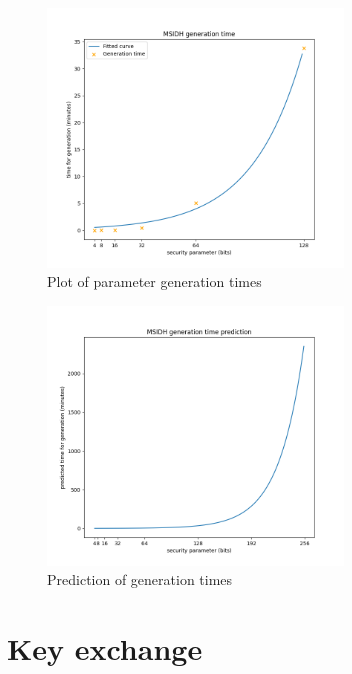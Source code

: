 \documentclass[a4paper,11pt,oneside]{report}
\begin{document}
    \begin{figure}
        \centering
        \includegraphics[width=0.7\textwidth]{img/Figure_3.png}
        \caption{Plot of parameter generation times}
        \label{fig:gen1}
    \end{figure}

    \begin{figure}
        \centering
        \includegraphics[width=0.7\textwidth]{img/Figure_4.png}
        \caption{Prediction of generation times}
        \label{fig:gen2}
    \end{figure}
    

\section{Key exchange}
\label{results:ke}
\end{document}
